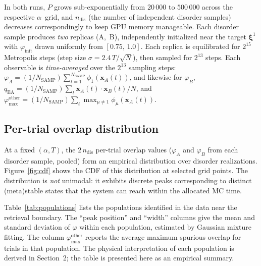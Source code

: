 \documentclass[11pt]{article}
\newcommand{\bxi}{\boldsymbol{\xi}}
\newcommand{\bx}{\mathbf{x}}
\begin{document}
In both runs, $P$ grows sub-exponentially from $20\,000$ to $500\,000$ across the respective $\alpha$~grid, and $n_{\mathrm{dis}}$ (the number of independent disorder samples) decreases correspondingly to keep GPU memory manageable.  Each disorder sample produces \emph{two} replicas (A,~B), independently initialized near the target $\bxi^1$ with $\varphi_{\mathrm{init}}$ drawn uniformly from $[0.75,\,1.0]$.  Each replica is equilibrated for $2^{15}$ Metropolis steps (step size $\sigma = 2.4\,T/\!\sqrt{N}$), then sampled for $2^{13}$ steps.  Each observable is \emph{time-averaged} over the $2^{13}$ sampling steps: $\varphi_A = (1/N_{\mathrm{SAMP}})\sum_{t=1}^{N_{\mathrm{SAMP}}}\phi_1(\bx_A(t))$, and likewise for $\varphi_B$, $q_{\mathrm{EA}} = (1/N_{\mathrm{SAMP}})\sum_t \bx_A(t)\!\cdot\!\bx_B(t)/N$, and $\varphi_{\max}^{\mathrm{other}} = (1/N_{\mathrm{SAMP}})\sum_t \max_{\mu\neq 1}\phi_\mu(\bx_A(t))$.

\subsection{Per-trial overlap distribution}

At a fixed $(\alpha, T)$, the $2\,n_{\mathrm{dis}}$ per-trial overlap values ($\varphi_A$ and $\varphi_B$ from each disorder sample, pooled) form an empirical distribution over disorder realizations.  Figure~\ref{fig:cdf} shows the CDF of this distribution at selected grid points.  The distribution is \emph{not} unimodal: it exhibits discrete peaks corresponding to distinct (meta)stable states that the system can reach within the allocated MC time.

Table~\ref{tab:populations} lists the populations identified in the data near the retrieval boundary.  The ``peak position'' and ``width'' columns give the mean and standard deviation of $\varphi$ within each population, estimated by Gaussian mixture fitting.  The column $\varphi_{\max}^{\mathrm{other}}$ reports the average maximum spurious overlap for trials in that population.  The physical interpretation of each population is derived in Section~2; the table is presented here as an empirical summary.
\end{document}
